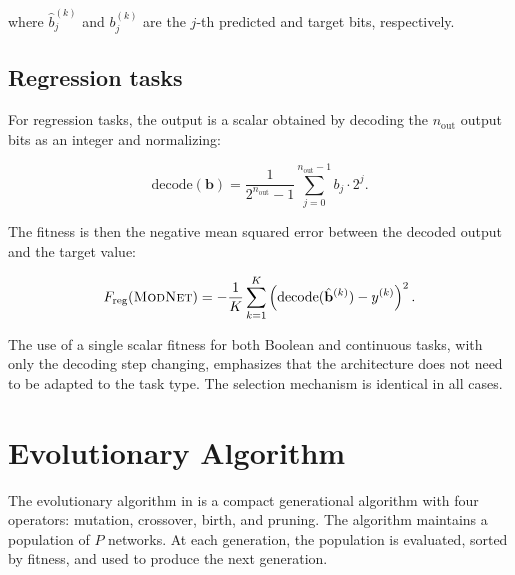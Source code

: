where $\hat{b}_j^{(k)}$ and $b_j^{(k)}$ are the $j$-th predicted and
target bits, respectively.

\subsection{Regression tasks}

For regression tasks, the output is a scalar obtained by decoding the
$n_{\text{out}}$ output bits as an integer and normalizing:

\begin{equation}
  \text{decode}(\mathbf{b}) = \frac{1}{2^{n_{\text{out}}} - 1}
    \sum_{j=0}^{n_{\text{out}}-1} b_j \cdot 2^j.
  \label{eq:method-decode}
\end{equation}

The fitness is then the negative mean squared error between the decoded
output and the target value:

\begin{equation}
  F_{\text{reg}}(\textsc{ModNet}{}) = -\frac{1}{K} \sum_{k=1}^{K}
    \left( \text{decode}(\hat{\mathbf{b}}^{(k)}) - y^{(k)} \right)^2.
  \label{eq:method-fitness-regression}
\end{equation}

\begin{remark}
The use of a single scalar fitness for both Boolean and continuous
tasks, with only the decoding step changing, emphasizes that the
architecture does not need to be adapted to the task type. The
selection mechanism is identical in all cases.
\end{remark}

\section{Evolutionary Algorithm}
\label{sec:method-evolution}

The evolutionary algorithm in \modnet{} is a compact generational
algorithm with four operators: mutation, crossover, birth, and pruning.
The algorithm maintains a population of $P$ networks. At each
generation, the population is evaluated, sorted by fitness, and used to
produce the next generation.

